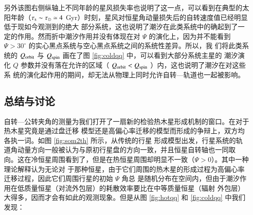 另外该图右侧纵轴上不同年龄的星风损失率也说明了这一点，可以看到在典型的太阳年龄（$\tau_\mathrm{s} \sim 
\tau_\odot \simeq 4 $ Gyr）时刻，星风对恒星角动量损失后的自转速度值已经明显低于现如今观测到的绝大
部分系统，这也说明了潮汐在此类系统中的确起到了一定的作用。然而折中潮汐作用并没有体现在对 $\Psi$
的演化上，因为并不能看到 $\Psi > 30^\circ$ 的实心黑点系统与空心黑点系统之间的系统性差异。所以，我
们将此类系统的 $Q_\mathrm{orbit}$ 与 $Q_\mathrm{spin}$  画在了图 \ref{fig:coldqq} 中，可以看到大部分系统主星的
潮汐演化 $Q$ 参数并没有落在允许的区域（ $Q_\mathrm{orbit} < Q_\mathrm{spin}$ ）内，这也说明了潮汐在对这些系
统的演化起作用的期间，却无法从物理上同时允许自转---轨道也一起被影响。

\subsection{总结与讨论}

自转---公转夹角的测量为我们打开了一扇新的检验热木星形成机制的窗口。在对于热木星究竟是通过盘迁移
模型还是高偏心率迁移的模型而形成的争辩上，双方均各执一词。如图 \ref{fig:som2th} 所示，从传统的行星
形成模型出发，行星系统的轨道角动量方向一般被认为与原初行星盘的方向一致，并且恒星自转轴也一同取
向。这在冷恒星周围看到了，但是在热恒星周围却明显不一致（$\Psi > 0$）。其中一种理论解释认为无论对
于那种恒星，由于它们周围的热木星的形成过程为高偏心率迁移过程，因此它们周围行星的初始 $\Psi$ 角总
是随机分布在空间内，但由于潮汐作用在低质量恒星（对流外包层）的耗散效率要比在中等质量恒星（辐射
外包层）大得多，因而才会有如此的观测现象\cite{Albrecht2012}。但是从图 \ref{fig:hotqq} 和 \ref{fig:coldqq} 
中我们发现：

